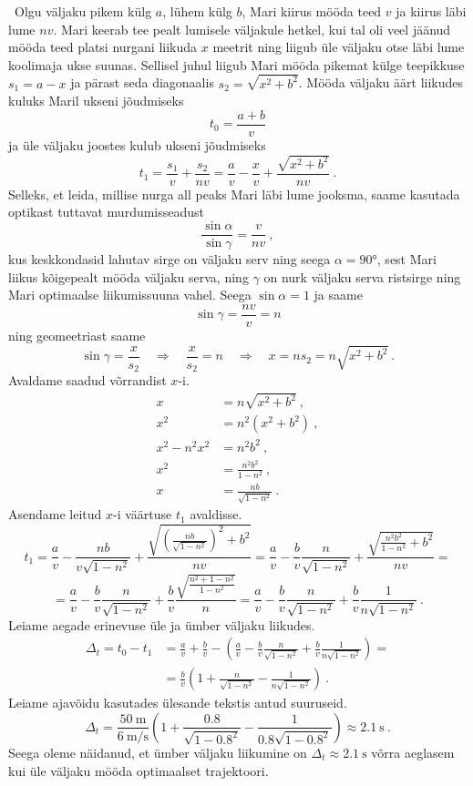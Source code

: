 \solu
\
Olgu väljaku pikem külg \(a\), lühem külg \(b\), Mari kiirus mööda teed \(v\) ja kiirus läbi lume \(nv\). Mari keerab tee pealt lumisele väljakule hetkel, kui tal oli veel jäänud mööda teed platsi nurgani liikuda \(x\) meetrit ning liigub üle väljaku otse läbi lume koolimaja ukse suunas. Sellisel juhul liigub Mari mööda pikemat külge teepikkuse \(s_1 = a - x\) ja pärast seda diagonaalis \(s_2 = \sqrt{x^2 + b^2}\). Mööda väljaku äärt liikudes kuluks Maril ukseni jõudmiseks
\[
    t_0 = \frac{a + b}{v}
\]
ja üle väljaku joostes kulub ukseni jõudmiseks
\[
    t_1 = \frac{s_1}{v} + \frac{s_2}{nv} = \frac{a}{v} - \frac{x}{v} + \frac{\sqrt{x^2 + b^2}}{nv} \ .
\]
Selleks, et leida, millise nurga all peaks Mari läbi lume jooksma, saame kasutada optikast tuttavat murdumisseadust
\[
    \frac{\sin \alpha}{\sin \gamma} = \frac{v}{nv} \ ,
\]
kus keskkondasid lahutav sirge on väljaku serv ning seega \(\alpha = \ang{90}\), sest Mari liikus kõigepealt mööda väljaku serva, ning \(\gamma\) on nurk väljaku serva ristsirge ning Mari optimaalse liikumissuuna vahel. Seega \(\sin \alpha = 1\) ja saame
\[
    \sin \gamma = \frac{nv}{v} = n
\]
ning geomeetriast saame
\[
    \sin \gamma = \frac{x}{s_2} \quad \Rightarrow \quad \frac{x}{s_2} = n \quad \Rightarrow \quad x = n s_2 = n \sqrt{x^2 + b^2} \ .
\]
Avaldame saadud võrrandist \(x\)-i.
\begin{align*}
    x &= n \sqrt{x^2 + b^2} \ , \\
    x^2 &= n^2 (x^2 + b^2) \ , \\
    x^2 - n^2 x^2 &= n^2 b^2 \ , \\
    x^2 &= \frac{n^2 b^2}{1 - n^2} \ , \\
    x &= \frac{n b}{\sqrt{1 - n^2}} \ .
\end{align*}
Asendame leitud \(x\)-i väärtuse \(t_1\) avaldisse.
\[
    t_1 = \frac{a}{v} - \frac{n b}{v\sqrt{1 - n^2}} + \frac{\sqrt{\left(\frac{n b}{\sqrt{1 - n^2}}\right)^2 + b^2}}{n v} = \frac{a}{v} - \frac{b}{v} \frac{n}{\sqrt{1-n^2}} + \frac{\sqrt{\frac{n^2 b^2}{1 - n^2} + b^2}}{n v} = 
\]
\[
    = \frac{a}{v} - \frac{b}{v} \frac{n}{\sqrt{1-n^2}} + \frac{b}{v} \frac{\sqrt{\frac{n^2 + 1 - n^2}{1-n^2}}}{n} = \frac{a}{v} - \frac{b}{v} \frac{n}{\sqrt{1-n^2}} + \frac{b}{v} \frac{1}{n\sqrt{1-n^2}} \ .
\]
Leiame aegade erinevuse üle ja ümber väljaku liikudes.
\begin{align*}
    \Delta_t = t_0 - t_1 &= \frac{a}{v} + \frac{b}{v} - \left( \frac{a}{v} - \frac{b}{v} \frac{n}{\sqrt{1-n^2}} + \frac{b}{v} \frac{1}{n\sqrt{1-n^2}} \right) = \\
    &= \frac{b}{v} \left( 1 + \frac{n}{\sqrt{1-n^2}} - \frac{1}{n\sqrt{1-n^2}} \right) \ .
\end{align*}
Leiame ajavõidu kasutades ülesande tekstis antud suuruseid.
\[
    \Delta_t = \frac{\SI{50}{\metre}}{\SI{6}{\metre\per\second}} \left( 1 + \frac{\num{0.8}}{\sqrt{1-\num{0.8}^2}} - \frac{1}{\num{0.8}\sqrt{1-\num{0.8}^2}} \right) \approx \SI{2.1}{\second} \ .
\]
Seega oleme näidanud, et ümber väljaku liikumine on \(\Delta_t \approx \SI{2.1}{\second}\) võrra aeglasem kui üle väljaku mööda optimaalset trajektoori. \\

